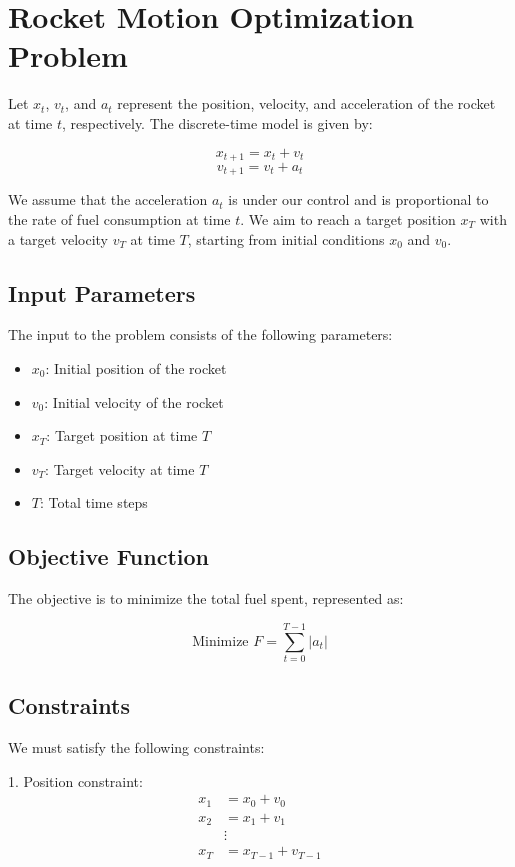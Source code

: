 \documentclass{article}
\begin{document}
\section*{Rocket Motion Optimization Problem}

Let \( x_t \), \( v_t \), and \( a_t \) represent the position, velocity, and acceleration of the rocket at time \( t \), respectively. The discrete-time model is given by:

\[
x_{t+1} = x_t + v_t
\]
\[
v_{t+1} = v_t + a_t
\]

We assume that the acceleration \( a_t \) is under our control and is proportional to the rate of fuel consumption at time \( t \). We aim to reach a target position \( x_T \) with a target velocity \( v_T \) at time \( T \), starting from initial conditions \( x_0 \) and \( v_0 \).

\subsection*{Input Parameters}

The input to the problem consists of the following parameters:

\begin{itemize}
    \item \( x_0 \): Initial position of the rocket
    \item \( v_0 \): Initial velocity of the rocket
    \item \( x_T \): Target position at time \( T \)
    \item \( v_T \): Target velocity at time \( T \)
    \item \( T \): Total time steps
\end{itemize}

\subsection*{Objective Function}

The objective is to minimize the total fuel spent, represented as:

\[
\text{Minimize } F = \sum_{t=0}^{T-1} |a_t|
\]

\subsection*{Constraints}

We must satisfy the following constraints:

1. Position constraint:
   \[
   \begin{aligned}
   x_1 & = x_0 + v_0 \\
   x_2 & = x_1 + v_1 \\
   & \vdots \\
   x_T & = x_{T-1} + v_{T-1} 
   \end{aligned}
   \]
   
\end{document}
